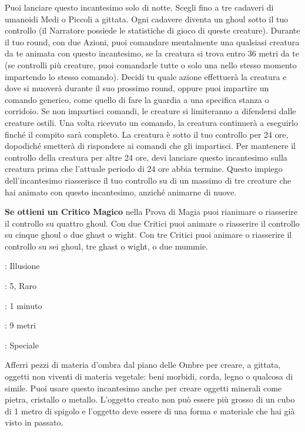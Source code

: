 \begin{multicols}{2}
Puoi lanciare questo incantesimo solo di notte. Scegli fino a tre cadaveri di umanoidi Medi o Piccoli a gittata. Ogni cadavere diventa un ghoul sotto il tuo controllo (il Narratore possiede le statistiche di gioco di queste creature). Durante il tuo round, con due Azioni, puoi comandare mentalmente una qualsiasi creatura da te animata con questo incantesimo, se la creatura si trova entro 36 metri da te (se controlli più creature, puoi comandarle tutte o solo una nello stesso momento impartendo lo stesso comando). Decidi tu quale azione effettuerà la creatura e dove si muoverà durante il suo prossimo round, oppure puoi impartire un comando generico, come quello di fare la guardia a una specifica stanza o corridoio. Se non impartisci comandi, le creature si limiteranno a difendersi dalle creature ostili. Una volta ricevuto un comando, la creatura continuerà a eseguirlo finché il compito sarà completo. La creatura è sotto il tuo controllo per 24 ore, dopodiché smetterà di rispondere ai comandi che gli impartisci. Per mantenere il controllo della creatura per altre 24 ore, devi lanciare questo incantesimo sulla creatura prima che l'attuale periodo di 24 ore abbia termine. Questo impiego dell'incantesimo riasserisce il tuo controllo su di un massimo di tre creature che hai animato con questo incantesimo, anziché animarne di nuove.

\textbf{Se ottieni un Critico Magico} nella Prova di Magia puoi rianimare o riasserire il controllo su quattro ghoul. Con due Critici puoi animare o riasserire il controllo su cinque ghoul o due ghast o wight. Con tre Critici puoi animare o riasserire il controllo su sei ghoul, tre ghast o wight, o due mummie.

\noindent\colorbox{OBSSgold!10}{
\begin{minipage}{0.95\linewidth}
\begin{description}[noitemsep, topsep=0pt, parsep=0pt, partopsep=0pt, leftmargin=0cm, labelwidth=1.3cm]
	\item[\textbf{Lista}]: Illusione
	\item[\textbf{Livello}]: 5, Raro
	\item[\textbf{Lancio}]: 1 minuto
	\item[\textbf{Gittata}]: 9 metri
	\item[\textbf{Durata}]: Speciale
\end{description}
\end{minipage}}\smallskip
Afferri pezzi di materia d'ombra dal piano delle Ombre per creare, a gittata, oggetti non viventi di materia vegetale: beni morbidi, corda, legno o qualcosa di simile. Puoi usare questo incantesimo anche per creare oggetti minerali come pietra, cristallo o metallo. L'oggetto creato non può essere più grosso di un cubo di 1 metro di spigolo e l'oggetto deve essere di una forma e materiale che hai già visto in passato.


\end{multicols}
